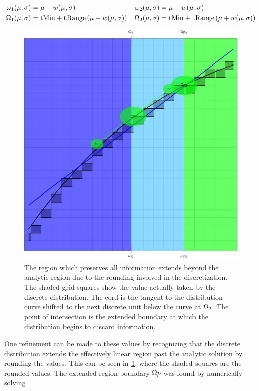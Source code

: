 \begin{equation}\label{eq:PreservedRegionGen}
\begin{aligned}
\omega_1(\mu,\sigma) &=                                    \mu - w(\mu,\sigma) &            \omega_2(\mu,\sigma) &=                                   \mu + w(\mu,\sigma) \\
\Omega_1(\mu,\sigma) &= \text{tMin} + \text{tRange}\left( \mu - w(\mu,\sigma) \right) & \Omega_2(\mu,\sigma) &= \text{tMin} + \text{tRange} \left(\mu + w(\mu,\sigma)\right)
\end{aligned}
\end{equation}

\begin{figure}[h]
\centering
\includegraphics[width=0.7\linewidth]{Chapter2/Figs/ExtensionToLinearRegion}
\caption{The region which preserves all information extends beyond the analytic region due to the rounding involved in the discretization. The shaded grid squares show the value actually taken by the discrete distribution. The cord is the tangent to the distribution curve shifted to the next discrete unit below the curve at $\Omega_2$. The point of intersection is the extended boundary at which the distribution begins to discard information.}
\label{fig:ExtensionToLinearRegion}
\end{figure}

One refinement can be made to these values by recognizing that the discrete distribution extends the effectively linear region past the analytic solution by rounding the values. This can be seen in \ref{fig:ExtensionToLinearRegion}, where the shaded squares are the rounded values. The extended region boundary $\Omega p$ was found by numerically solving 

